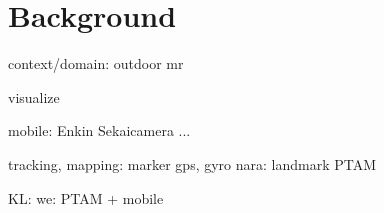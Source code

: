 \chapter{Background}
\label{Chapter2}

context/domain: outdoor mr

visualize

mobile:
Enkin
Sekaicamera
...

tracking, mapping:
marker
gps, gyro
nara: landmark
PTAM

KL:
we: PTAM + mobile
